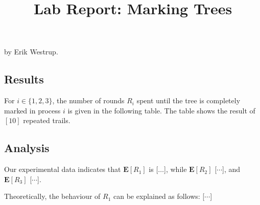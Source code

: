 \documentclass{tufte-handout}
\title{\sf Lab Report: Marking Trees}
\date{}
\begin{document}
\maketitle

by Erik Westrup. 

\subsection{Results}

For $i\in\{1,2,3\}$, the number of rounds $R_i$ spent until the tree
is completely marked in process $i$ is given in the following table.
The table shows the result of $[10]$ repeated
trails.



\subsection{Analysis}

Our experimental data indicates that $\mathbf E [R_1]$ is [$\ldots$],
while $\mathbf E[R_2]$ [$\cdots$], and $\mathbf E[R_3]$
[$\cdots$].

Theoretically, the behaviour of $R_1$ can be explained as follows: [$\cdots$] 
\end{document}
